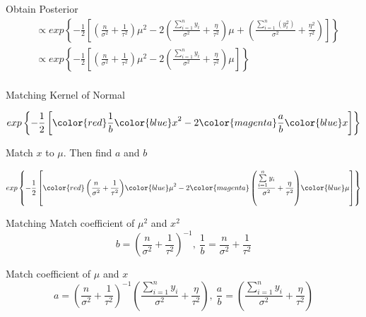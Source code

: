 \documentclass[10pt]{beamer}
\begin{document}
\begin{frame}{Obtain Posterior}
  \begin{align*}
    &\propto exp\left\{-\frac{1}{2}\left[\left(\frac{n}{\sigma^2}+\frac{1}{\tau^2}\right)\mu^2-2\left(\frac{\sum\limits_{i=1}^{n} y_i}{\sigma^2}+\frac{\eta}{\tau^2}\right)\mu
      +\left(\frac{\sum\limits_{i=1}^{n} (y^2_i)}{\sigma^2}+\frac{\eta^2}{\tau^2}\right)\right]\right\}\\
    &\propto exp\left\{-\frac{1}{2}\left[\left(\frac{n}{\sigma^2}+\frac{1}{\tau^2}\right)\mu^2-2\left(\frac{\sum\limits_{i=1}^{n} y_i}{\sigma^2}+\frac{\eta}{\tau^2}\right)\mu
      \right]\right\}\\
  \end{align*}
\end{frame}
\begin{frame}{Matching}
  Kernel of Normal


  {
    \begin{equation*}
      exp\left\{-\frac{1}{2}\left[{\color{red} \frac{1}{b}}{\color{blue} x}^2-2{\color{magenta} \frac{a}{b}}{\color{blue} x}\right]\right\}
    \end{equation*}
  }

  Match $x$ to $\mu$.  Then find $a$ and $b$


  {
    \begin{equation*}
      exp \left\{-\frac{1}{2}\left[{\color{red} \left(\frac{n}{\sigma^2}+\frac{1}{\tau^2}\right)}{\color{blue} \mu}^2-2{\color{magenta} \left(\frac{\sum\limits_{i=1}^{n} y_i}{\sigma^2}+\frac{\eta}{\tau^2}\right)}{\color{blue} \mu}\right]\right\}
    \end{equation*}
  }

\end{frame}
\begin{frame}{Matching}
  Match coefficient of $\mu^2$ and $x^2$
  \begin{equation}
    {b=\left(\frac{n}{\sigma^2}+\frac{1}{\tau^2}\right)^{-1}}, ~{\frac{1}{b}=\frac{n}{\sigma^2}+\frac{1}{\tau^2}}
  \end{equation}


  Match coefficient of $\mu$ and $x$
  \begin{equation}
    {a=\left(\frac{n}{\sigma^2}+\frac{1}{\tau^2}\right)^{-1}\left(\frac{\sum\limits_{i=1}^{n} y_i}{\sigma^2}+\frac{\eta}{\tau^2}\right)},~{\frac{a}{b}=\left(\frac{\sum\limits_{i=1}^{n} y_i}{\sigma^2}+\frac{\eta}{\tau^2}\right)}
  \end{equation}

\end{frame}
\end{document}
